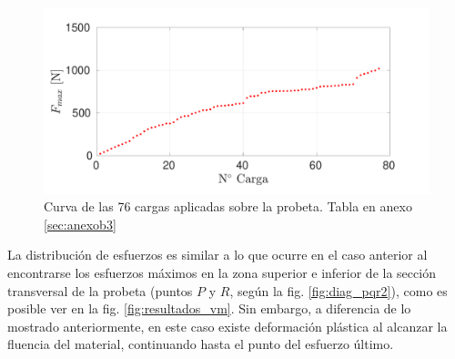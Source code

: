 \begin{figure}[h]
\centering
\includegraphics[width=1\linewidth, trim={0cm 0cm 1cm 0cm}, clip]{Imagenes/f_step.pdf}
\caption{Curva de las 76 cargas aplicadas sobre la probeta. Tabla en anexo \ref{sec:anexob3}}
\label{fig:f_step}
\end{figure}

La distribución de esfuerzos es similar a lo que ocurre en el caso anterior al encontrarse los esfuerzos máximos en la zona superior e inferior de la sección transversal de la probeta (puntos $P$ y $R$, según la fig. \ref{fig:diag_pqr2}), como es posible ver en la fig. \ref{fig:resultados_vm}. Sin embargo, a diferencia de lo mostrado anteriormente, en este caso existe deformación plástica al alcanzar la fluencia del material, continuando hasta el punto del esfuerzo último.



